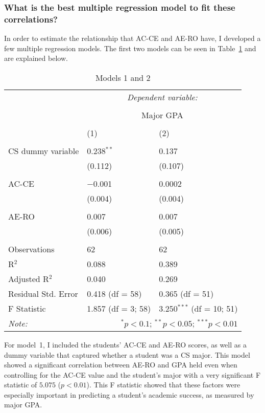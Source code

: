 \subsubsection{What is the best multiple regression model to fit these correlations?}
In order to estimate the relationship that AC-CE and AE-RO have, I developed a few multiple regression models. The first two models can be seen in Table~\ref{tab:c-models12} and are explained below.

\begin{table}[!htbp]
  \centering
  \caption[Models 1 and 2]{Models 1 and 2}
  \label{tab:c-models12}
  \begin{tabular}{@{\extracolsep{5pt}}lll}
  \toprule
   & \multicolumn{2}{c}{\textit{Dependent variable:}} \\
  \cline{2-3}
  \\[-1.8ex] & \multicolumn{2}{c}{Major GPA} \\
  \\[-1.8ex] & (1) & (2)\\
  \hline \\[-1.8ex]
  CS dummy variable & 0.238$^{**}$ & 0.137 \\
    & (0.112) & (0.107) \\
    & & \\
  AC-CE & $-$0.001 & 0.0002 \\
    & (0.004) & (0.004) \\
    & & \\
  AE-RO & 0.007 & 0.007 \\
    & (0.006) & (0.005) \\
    & & \\
  \midrule
  Observations & 62 & 62 \\
  R$^{2}$ & 0.088 & 0.389 \\
  Adjusted R$^{2}$ & 0.040 & 0.269 \\
  Residual Std. Error & 0.418 (df = 58) & 0.365 (df = 51) \\
  F Statistic & 1.857 (df = 3; 58) & 3.250$^{***}$ (df = 10; 51) \\
  \bottomrule
  \textit{Note:}  & \multicolumn{2}{r}{$^{*}p<0.1$; $^{**}p<0.05$; $^{***}p<0.01$} \\
  \end{tabular}
\end{table}

For model~1, I included the students' AC-CE and AE-RO scores, as well as a dummy variable that captured whether a student was a CS major. This model showed a significant correlation between AE-RO and GPA held even when controlling for the AC-CE value and the student's major with a very significant F statistic of $5.075$ ($p<0.01$). This F statistic showed that these factors were especially important in predicting a student's academic success, as measured by major GPA.

